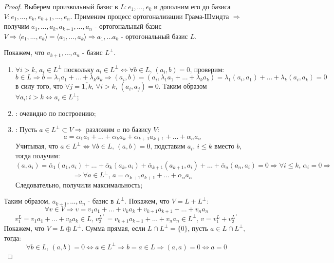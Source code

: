\documentclass[12pt]{article}
\theoremstyle{definition}
\begin{document}
\begin{proof}
	Выберем произвольный базис в $L \colon e_1, \dotsc, e_k$ и дополним его до базиса $V \colon e_1, \dotsc, e_k, e_{k+1} ,\dotsc, e_n$. Применим процесс ортогонализации Грама-Шмидта $\Rightarrow$ получим $a_1, \dotsc, a_k, a_{k+1}, \dotsc, a_n$ - ортогональный базис $V \Rightarrow \langle e_1, \dotsc, e_k \rangle = \langle a_1, \dotsc, a_k \rangle \Rightarrow a_1, \dotsc a_k$ - ортогональный базис $L$. 
	
	Покажем, что $a_{k+1}, \dotsc, a_n$ - базис $L^\bot$.
	\begin{enumerate}[label ={(\arabic*)}]
		\item $\forall i > k, \, a_i \in L^\bot$ поскольку $a_i \in L^\bot \Leftrightarrow \forall b \in L, \, (a_i,b) = 0$, проверим:
		$$
	 		b \in L \Rightarrow b = \lambda_1a_1 + \dotsc + \lambda_k a_k \Rightarrow (a_i,b) = (a_i, \lambda_1 a_1 + \dotsc + \lambda_k a_k) = \lambda_1 (a_i, a_1) + \dotsc + \lambda_k (a_i, a_k) = 0
		$$
		в силу того, что $\forall j = \overline{1,k}, \, \forall i > k, \, (a_i, a_j) = 0$. Таким образом $\forall a_i \colon i > k \Leftrightarrow a_i \in L^\bot$;
		\item {}: очевидно по построению;
		\item {}: Пусть $a \in L^\bot \subset V \Rightarrow$ разложим $a$ по базису $V$:
		$$
			a = \alpha_1 a_1 + \dotsc + \alpha_k a_k + \alpha_{k+1}a_{k+1} + \dotsc + \alpha_n a_n
		$$
		Учитывая, что $a \in L^\bot \Leftrightarrow \forall b \in L, \, (a,b) = 0$, подставим $a_i, \, i \leq k$ вместо $b$, тогда получим:
		$$
			(a,a_i) = \overline{\alpha}_1(a_1, a_i) + \dotsc + \overline{\alpha}_k(a_k,a_i) + \overline{\alpha}_{k+1}(a_{k+1},a_i) + \dotsc + \overline{\alpha}_n(a_n,a_i) = 0 \Rightarrow \forall i \leq k, \, \alpha_i =0 \Rightarrow
		$$
		$$
			\Rightarrow \forall a \in L^\bot, \, a = \alpha_{k+1} a_{k+1} +  \dotsc + \alpha_n a_n
		$$
		Следовательно, получили максимальность;
	\end{enumerate}
	Таким образом, $a_{k+1}, \dotsc, a_n$ - базис в $L^\bot$. Покажем, что $V = L + L^\bot$:
	$$
		 \forall v \in V \Rightarrow v = v_1a_1 + \dotsc + v_k a_k + v_{k+1} a_{k+1} + \dotsc + v_n a_n
	$$
	$$
		v_1^L = v_1a_1 + \dotsc + v_k a_k \in L, \, v_2^{L^\bot} =  v_{k+1} a_{k+1} + \dotsc + v_n a_n \in L^\bot, \, v = v_1^L + v_2^{L^\bot}
	$$
	Покажем, что $V = L \oplus L^\bot$. Сумма прямая, если $L \cap L^\bot = \{0\}$, пусть $a \in L \cap L^\bot$, тогда:
	$$
		\forall b \in L, \, (a,b) = 0 \Leftrightarrow a \in L^\bot \Rightarrow b = a \in L \Rightarrow (a,a) = 0 \Leftrightarrow a = 0
	$$
\end{proof}
\end{document}
